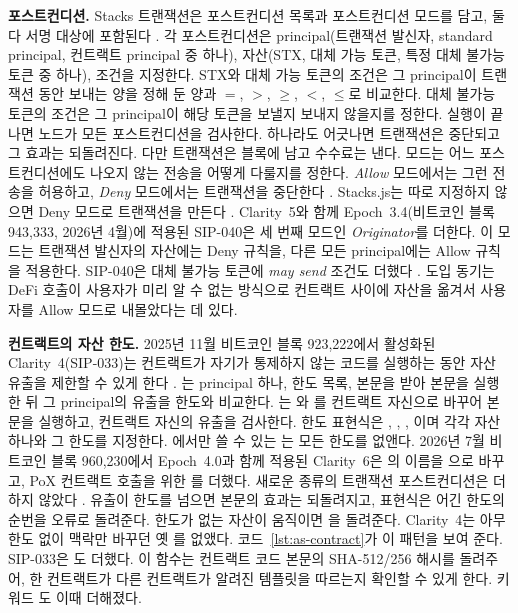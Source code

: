 \textbf{포스트컨디션.} Stacks 트랜잭션은 포스트컨디션 목록과 포스트컨디션 모드를 담고, 둘 다 서명 대상에 포함된다 \cite{sip005}. 각 포스트컨디션은 principal(트랜잭션 발신자, standard principal, 컨트랙트 principal 중 하나), 자산(STX, 대체 가능 토큰, 특정 대체 불가능 토큰 중 하나), 조건을 지정한다. STX와 대체 가능 토큰의 조건은 그 principal이 트랜잭션 동안 보내는 양을 정해 둔 양과 $=$, $>$, $\geq$, $<$, $\leq$로 비교한다. 대체 불가능 토큰의 조건은 그 principal이 해당 토큰을 보낼지 보내지 않을지를 정한다. 실행이 끝나면 노드가 모든 포스트컨디션을 검사한다. 하나라도 어긋나면 트랜잭션은 중단되고 그 효과는 되돌려진다. 다만 트랜잭션은 블록에 남고 수수료는 낸다. 모드는 어느 포스트컨디션에도 나오지 않는 전송을 어떻게 다룰지를 정한다. \emph{Allow} 모드에서는 그런 전송을 허용하고, \emph{Deny} 모드에서는 트랜잭션을 중단한다 \cite{sip005}. Stacks.js는 따로 지정하지 않으면 Deny 모드로 트랜잭션을 만든다 \cite{hiropostconditions}. Clarity~5와 함께 Epoch~3.4(비트코인 블록 943,333, 2026년 4월)에 적용된 SIP-040은 세 번째 모드인 \emph{Originator}를 더한다. 이 모드는 트랜잭션 발신자의 자산에는 Deny 규칙을, 다른 모든 principal에는 Allow 규칙을 적용한다. SIP-040은 대체 불가능 토큰에 \emph{may send} 조건도 더했다 \cite{sip040,sip039}. 도입 동기는 DeFi 호출이 사용자가 미리 알 수 없는 방식으로 컨트랙트 사이에 자산을 옮겨서 사용자를 Allow 모드로 내몰았다는 데 있다.

\textbf{컨트랙트의 자산 한도.} 2025년 11월 비트코인 블록 923,222에서 활성화된 Clarity~4(SIP-033)는 컨트랙트가 자기가 통제하지 않는 코드를 실행하는 동안 자산 유출을 제한할 수 있게 한다 \cite{sip033}. 는 principal 하나, 한도 목록, 본문을 받아 본문을 실행한 뒤 그 principal의 유출을 한도와 비교한다. 는 와 를 컨트랙트 자신으로 바꾸어 본문을 실행하고, 컨트랙트 자신의 유출을 검사한다. 한도 표현식은 , , , 이며 각각 자산 하나와 그 한도를 지정한다. 에서만 쓸 수 있는 는 모든 한도를 없앤다. 2026년 7월 비트코인 블록 960,230에서 Epoch~4.0과 함께 적용된 Clarity~6은 의 이름을 으로 바꾸고, PoX 컨트랙트 호출을 위한 를 더했다. 새로운 종류의 트랜잭션 포스트컨디션은 더하지 않았다 \cite{sip044}. 유출이 한도를 넘으면 본문의 효과는 되돌려지고, 표현식은 어긴 한도의 순번을 오류로 돌려준다. 한도가 없는 자산이 움직이면 을 돌려준다. Clarity~4는 아무 한도 없이 맥락만 바꾸던 옛 를 없앴다. 코드~\ref{lst:as-contract}가 이 패턴을 보여 준다. SIP-033은 도 더했다. 이 함수는 컨트랙트 코드 본문의 SHA-512/256 해시를 돌려주어, 한 컨트랙트가 다른 컨트랙트가 알려진 템플릿을 따르는지 확인할 수 있게 한다. 키워드 도 이때 더해졌다.

